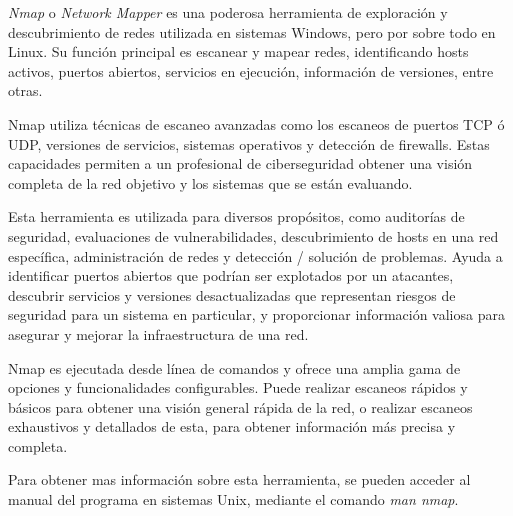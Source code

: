 \documentclass[12pt,oneside,a4paper]{book}
\begin{document}
\begin{enumerate}
\begin{enumerate}
        \hspace{20pt}
        \textit{Nmap} o \textit{Network Mapper} es una poderosa herramienta de exploración y descubrimiento de redes utilizada en sistemas Windows, pero por sobre todo en Linux. Su función principal es escanear y mapear redes, identificando hosts activos, puertos abiertos, servicios en ejecución, información de versiones, entre otras.
        
        \vspace{1em}

        \hspace{20pt}
        Nmap utiliza técnicas de escaneo avanzadas como los escaneos de puertos TCP ó UDP, versiones de servicios, sistemas operativos y detección de firewalls. Estas capacidades permiten a un profesional de ciberseguridad obtener una visión completa de la red objetivo y los sistemas que se están evaluando.

        \vspace{1em}

        \hspace{20pt}
        Esta herramienta es utilizada para diversos propósitos, como auditorías de seguridad, evaluaciones de vulnerabilidades, descubrimiento de hosts en una red específica, administración de redes y detección / solución de problemas. Ayuda a identificar puertos abiertos que podrían ser explotados por un atacantes, descubrir servicios y versiones desactualizadas que representan riesgos de seguridad para un sistema en particular, y proporcionar información valiosa para asegurar y mejorar la infraestructura de una red.

        \vspace{1em}

        \hspace{20pt}
        Nmap es ejecutada desde línea de comandos y ofrece una amplia gama de opciones y funcionalidades configurables. Puede realizar escaneos rápidos y básicos para obtener una visión general rápida de la red, o realizar escaneos exhaustivos y detallados de esta, para obtener información más precisa y completa.
        
        \vspace{1em}

        \hspace{20pt}
        Para obtener mas información sobre esta herramienta, se pueden acceder al manual del programa en sistemas Unix, mediante el comando \textit{man nmap}.

        \vspace{1em}


\end{enumerate}
\end{enumerate}
\end{document}
